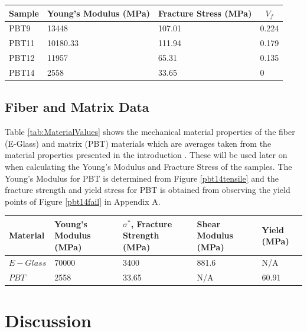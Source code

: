 \documentclass[11pt]{article}
\begin{document}
\begin{center}
 \label{tab:TestValues}
\begin{tabular}{p{1.5cm} || p{} | p{} | p{1.5cm} }
\hline
Sample & \multicolumn{1}{c|}{Young's Modulus (MPa)} & \multicolumn{1}{c|}{Fracture Stress (MPa)} & \multicolumn{1}{c}{\(V_f\)}  \\
\hline
\hline
PBT9 & 13448 & 107.01 & 0.224\\
PBT11 & 10180.33  & 111.94 & 0.179\\
PBT12 & 11957 & 65.31 & 0.135 \\
PBT14 & 2558 & 33.65 & 0\\
\hline
\end{tabular}
\end{center}

\subsection{Fiber and Matrix Data}
Table \ref{tab:MaterialValues} shows the mechanical material properties of the fiber (E-Glass) and matrix (PBT) materials which are averages taken from the material properties presented in the introduction \cite{PBTmechProperties} \cite{course_notes}. These will be used later on when calculating the Young's Modulus and Fracture Stress of the samples. The Young's Modulus for PBT is determined from Figure \ref{pbt14tensile} and the fracture strength and yield stress for PBT is obtained from observing the yield points of Figure \ref{pbt14fail} in Appendix A.

\newpage
\begin{center}
 \label{tab:MaterialValues}
\begin{tabular}{p{2.5cm} || p{} | p{} | p{2.5cm} | p{} }
\hline
Material & Young's Modulus (MPa) & \(\sigma^*\), Fracture Strength (MPa) & Shear Modulus (MPa) & Yield (MPa)\\
\hline
\hline
\(E-Glass\) \cite{course_notes} & 70000 &  3400 & 881.6 & N/A \\
\(PBT\) \cite{PBTmechProperties} & 2558 & 33.65 & N/A & 60.91\\
\hline
\end{tabular}
\end{center}
\singlespacing

\section{Discussion}
\end{document}
